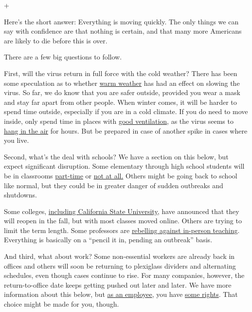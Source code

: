 +

Here's the short answer: Everything is moving quickly. The only things
we can say with confidence are that nothing is certain, and that many
more Americans are likely to die before this is over.

There are a few big questions to follow.

First, will the virus return in full force with the cold weather? There
has been some speculation as to whether
\href{https://www.nytimes3xbfgragh.onion/2020/03/22/health/warm-weather-coronavirus.html}{warm
weather} has had an effect on slowing the virus. So far, we do know that
you are safer outside, provided you wear a mask and stay far apart from
other people. When winter comes, it will be harder to spend time
outside, especially if you are in a cold climate. If you do need to move
inside, only spend time in places with
\href{https://www.nytimes3xbfgragh.onion/2020/07/06/health/coronavirus-airborne-aerosols.html}{good
ventilation}, as the virus seems to
\href{https://www.nytimes3xbfgragh.onion/2020/07/04/health/239-experts-with-one-big-claim-the-coronavirus-is-airborne.html}{hang
in the air} for hours. But be prepared in case of another spike in cases
where you live.

Second, what's the deal with schools? We have a section on this below,
but expect significant disruption. Some elementary through high school
students will be in classrooms
\href{https://www.nytimes3xbfgragh.onion/2020/06/26/us/coronavirus-schools-reopen-fall.html}{part-time}
or
\href{https://www.nytimes3xbfgragh.onion/2020/07/13/us/lausd-san-diego-school-reopening.html}{not
at all.} Others might be going back to school like normal, but they
could be in greater danger of sudden outbreaks and shutdowns.

Some colleges,
\href{https://www.nytimes3xbfgragh.onion/2020/05/12/us/cal-state-online-classes.html}{including
California State University}, have announced that they will reopen in
the fall, but with most classes moved online. Others are trying to limit
the term length. Some professors are
\href{https://www.nytimes3xbfgragh.onion/2020/07/03/us/coronavirus-college-professors.html}{rebelling
against in-person teaching}. Everything is basically on a ``pencil it
in, pending an outbreak'' basis.

And third, what about work? Some non-essential workers are already back
in offices and others will soon be returning to plexiglass dividers and
alternating schedules, even though cases continue to rise. For many
companies, however, the return-to-office date keeps getting pushed out
later and later. We have more information about this below, but
\href{https://www.cdc.gov/coronavirus/2019-ncov/community/guidance-business-response.html}{as
an employee}, you have
\href{https://www.osha.gov/SLTC/covid-19/standards.html}{some rights}.
That choice might be made for you, though.

